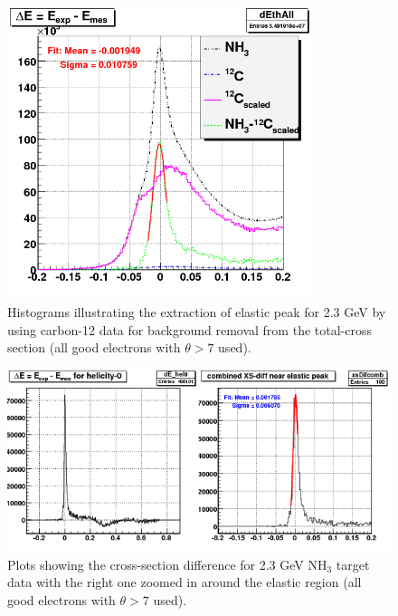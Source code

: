 \begin{figure}[h] %
\centering
  \leavevmode \includegraphics[width=0.8\textwidth]{figuresEG4/DcSmear/dE_elastProdEb3.png} 
  \caption[Background subtraction to get elastic peak]{Histograms illustrating the extraction of elastic peak for 2.3 GeV by using carbon-12 data for background removal from the total-cross section (all good electrons with $\theta>7$ used).}
  \label{fig:elNH3mC}
\end{figure}

\begin{figure}[h] %
\centering
  \leavevmode \includegraphics[width=1.0\textwidth]{figuresEG4/DcSmear/dE_elastXsDiffEb0Tgt11.png} 
  \caption[Cross-section difference]{Plots showing the cross-section difference for 2.3 GeV NH$_3$ target data with the right one zoomed in around the elastic region (all good electrons with $\theta>7$ used).}
  \label{fig:elXsDif}
\end{figure}

